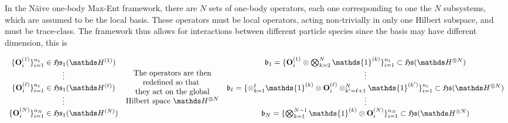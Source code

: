 \documentclass{homework}
\begin{document}
\begin{tcolorbox}[title = N\"aive one-body Max-Ent]
    In the N\"aive one-body Max-Ent framework, there are $N$ sets of one-body operators, each one corresponding to one the $N$ subsystems, which are assumed to be the local basis. These operators must be local operators, acting non-trivially in only one Hilbert subspace, and must be trace-class. The framework thus allows for interactions between different particle species since the basis may have different dimension, this is
    
    \begin{equation*}
        \begin{array}{c}
            \{\mathbf{O}_i^{(1)}\}_{i=1}^{n_1}\in \mathfrak{H}\mathfrak{s}_1(\hilbert^{(1)})  \\
            \vdots \\
            \{\mathbf{O}_i^{(\ell)}\}_{i=1}^{n_{\ell}}\in \mathfrak{H}\mathfrak{s}_1(\hilbert^{(\ell)}) \\
            \vdots \\
            \{\mathbf{O}_i^{(N)}\}_{i=1}^{n_N}\in \mathfrak{H}\mathfrak{s}_1(\hilbert^{(N)})
        \end{array} \begin{array}{c}
             \textnormal{ The operators are then }\\
             \textnormal{redefined so that } \\
             \textnormal{they act on the global} \\
             \textnormal{Hilbert space $\hilbert^{\otimes N}$}
        \end{array} \begin{array}{c}
            \mathfrak{b}_1 = \{\mathbf{O}_i^{(1)} \otimes \bigotimes_{k=2}^{N} \mathds{1}^{(k)}\}_{i=1}^{n_1}\subset \mathfrak{H}\mathfrak{s}(\hilbert^{\otimes N}) \\
            \vdots \\
            \mathfrak{b}_\ell =  \{\otimes_{k=1}^{\ell} \mathds{1}^{(k)} \otimes \mathbf{O}_i^{(\ell)} \otimes_{k' = \ell + 1}^{N} \mathds{1}^{(k')}\}_{i=1}^{n_\ell}\subset \mathfrak{H}\mathfrak{s}(\hilbert^{\otimes N})\\
            \vdots \\
            \mathfrak{b}_N = \{ \bigotimes_{k=1}^{N-1} \mathds{1}^{(k)} \otimes  \mathbf{O}_i^{(N)}\}_{i=1}^{n_N}\subset \mathfrak{H}\mathfrak{s}(\hilbert^{\otimes N})
        \end{array}
    \end{equation*}
    

\end{tcolorbox}
\end{document}
